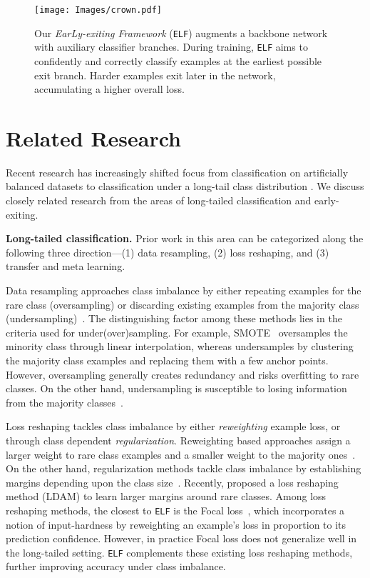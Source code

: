 \documentclass{article}
\newcommand{\method}{\texttt{ELF}\xspace}
\begin{document}
\begin{figure}[t!]
\centering
\texttt{[image: Images/crown.pdf]}
   \caption{Our \textit{EarLy-exiting Framework} (\method) augments a backbone network with auxiliary classifier branches. 
    During training, \method{} aims to confidently and correctly classify examples at the earliest possible exit branch.
    Harder examples exit later in the network, accumulating a higher overall loss. 
}
    \label{fig:crown}
\end{figure}

 \section{Related Research}
Recent research has increasingly shifted focus from classification on artificially balanced datasets \cite{deng2009imagenet, duggal2019cup} to classification under a long-tail class distribution \cite{liu2019large, duggal2020rest}. We discuss closely related research from the areas of long-tailed classification and early-exiting.

\textbf{Long-tailed classification.}
 Prior work in this area can be categorized along the following three direction---(1) data resampling, (2) loss reshaping, and (3) transfer and meta learning.

Data resampling approaches class imbalance by either repeating examples for the rare class (oversampling) \cite{wilson1972asymptotic, chawla2002smote, han2005borderline, he2008adasyn} or discarding existing examples from the majority class (undersampling)~\cite{wilson1972asymptotic, yen2009cluster}. 
The distinguishing factor among these methods lies in the criteria used for under(over)sampling. 
For example, SMOTE~\cite{chawla2002smote} oversamples the minority class through linear interpolation, whereas \cite{yen2009cluster} undersamples by clustering the majority class examples and replacing them with a few anchor points. 
However, oversampling generally creates redundancy and 
risks overfitting to rare classes.
On the other hand, undersampling is susceptible to losing information from the majority classes~\cite{buda2018systematic}.

Loss reshaping tackles class imbalance by either \textit{reweighting} example loss, or through class dependent \textit{regularization}. 
Reweighting based approaches assign a larger weight to rare class examples and a smaller weight to the majority ones~\cite{cui2019class, huang2019deep, wang2017learning, zhang2017range, dong2017class, huang2016learning}. 
On the other hand, regularization methods tackle class imbalance by establishing margins depending upon the class size~\cite{liu2016large, liu2017sphereface, wang2018additive}.
Recently, \cite{cao2019learning} proposed a loss reshaping method (LDAM) to learn larger margins around rare classes.
Among loss reshaping methods, the closest to \method{} is the Focal loss~\cite{lin2017focal}, which incorporates a notion of input-hardness by reweighting an example's loss in proportion to its prediction confidence.
However, in practice Focal loss does not generalize well in the long-tailed setting.
\method{} complements these existing loss reshaping methods, further improving accuracy under class imbalance.
\end{document}
